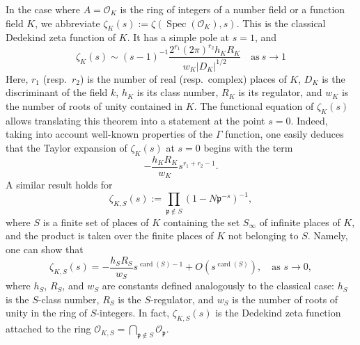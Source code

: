 \documentclass[12pt]{amsart}
\begin{document}
In the case where $A = \mathcal{O}_K$ is the ring of integers of a number field or a function field $K$,  we abbreviate $
\zeta_K(s) := \zeta(\operatorname{Spec}(\mathcal{O}_K), s).$ 
This is the classical Dedekind zeta function of $K$.  It has a simple pole at $s=1$, and 
\[\zeta_K(s)\sim (s-1)^{-1} \frac{2^{r_1} (2\pi)^{r_2}h_K R_K }{w_K |D_K|^{1/2}}\quad  \text{as}\ s\rightarrow 1\]
Here, $r_1$ (resp.\ $r_2$) is the number of real (resp.\ complex) places of $K$, $D_K$ is the discriminant of the field $k$, $h_K$ is its class number, $R_K$ is its regulator, and $w_K$ is the number of roots of unity contained in $K$. The functional equation of $\zeta_K(s)$ allows translating this theorem into a statement at the point $s = 0$. Indeed, taking into account well-known properties of the $\Gamma$ function, one easily deduces   that
the Taylor expansion of $\zeta_K(s)$ at $s = 0$ begins with the term
\[
-\frac{h_KR_K}{w_K} s^{r_1 + r_2 - 1}.
\]
A similar result holds for
\[
\zeta_{K,S}(s) := \prod_{\mathfrak{p} \notin S} (1 - N\mathfrak{p}^{-s})^{-1},
\]
where $S$ is a finite set of places of $K$ containing the set $S_\infty$ of infinite places of $K$, and the product is taken over the finite places of $K$ not belonging to $S$. Namely, one can show that
\begin{equation}\label{cK}
\zeta_{K,S}(s) = -\frac{h_S R_S}{w_S}  s^{\operatorname{card}(S) - 1} + O(s^{\operatorname{card}(S)}),
\quad \text{as } s \to 0,
\end{equation}
where $h_S$, $R_S$, and $w_S$ are constants defined analogously to the classical case: $h_S$ is the $S$-class number, $R_S$ is the $S$-regulator, and $w_S$ is the number of roots of unity in the ring of $S$-integers. In fact, $\zeta_{K,S}(s)$ is the Dedekind zeta function attached to the ring $
\mathcal{O}_{K,S} = \bigcap_{\mathfrak{p} \notin S} \mathcal{O}_{\mathfrak{p}}.$ \\
\end{document}
